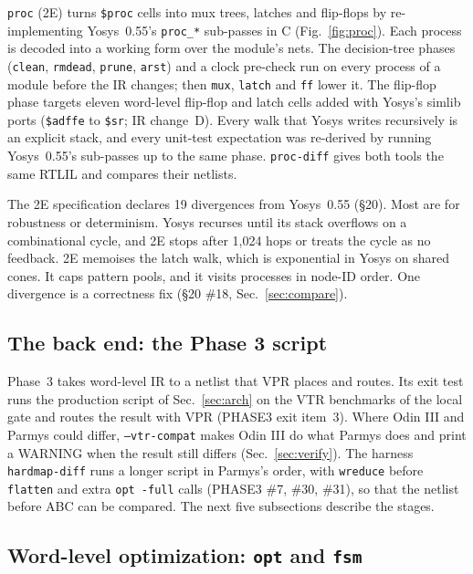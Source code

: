 \documentclass[conference]{IEEEtran}
\newcommand{\code}[1]{\texttt{#1}}
\begin{document}
\code{proc} (2E) turns \code{\$proc} cells into mux trees, latches and flip-flops by
re-implementing Yosys~0.55's \code{proc\_*} sub-passes in C (Fig.~\ref{fig:proc}). Each
process is decoded into a working form over the module's nets. The decision-tree phases
(\code{clean}, \code{rmdead}, \code{prune}, \code{arst}) and a clock pre-check run on every
process of a module before the IR changes; then \code{mux}, \code{latch} and \code{ff} lower
it. The flip-flop phase targets eleven word-level flip-flop and latch cells added with Yosys's
simlib ports (\code{\$adffe} to \code{\$sr}; IR change~D). Every walk that Yosys writes
recursively is an explicit stack, and every unit-test expectation was re-derived by running
Yosys~0.55's sub-passes up to the same phase. \code{proc-diff} gives both tools the same RTLIL
and compares their netlists.

The 2E specification declares 19 divergences from Yosys~0.55 (\S20). Most are for robustness or
determinism. Yosys recurses until its stack overflows on a combinational cycle, and 2E stops
after 1,024 hops or treats the cycle as no feedback. 2E memoises the latch walk, which is
exponential in Yosys on shared cones. It caps pattern pools, and it visits processes in node-ID
order. One divergence is a correctness fix (\S20 \#18, Sec.~\ref{sec:compare}).

\subsection{The back end: the Phase 3 script}
\label{sec:backend}

Phase~3 takes word-level IR to a netlist that VPR places and routes. Its exit test runs the
production script of Sec.~\ref{sec:arch} on the VTR benchmarks of the local gate and routes the
result with VPR (PHASE3 exit item~3). Where Odin III and Parmys could differ,
\code{--vtr-compat} makes Odin III do what Parmys does and print a WARNING when the result still
differs (Sec.~\ref{sec:verify}). The harness \code{hardmap-diff} runs a longer script in Parmys's
order, with \code{wreduce} before \code{flatten} and extra \code{opt -full} calls (PHASE3 \#7,
\#30, \#31), so that the netlist before ABC can be compared. The next five subsections describe
the stages.

\subsection{Word-level optimization: \code{opt} and \code{fsm}}
\label{sec:opt}
\end{document}
